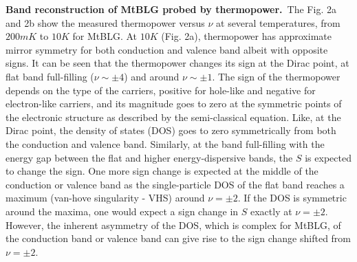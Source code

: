 \documentclass{nature}
\begin{document}
\noindent\textbf{Band reconstruction of MtBLG probed by thermopower.}\ 
The Fig. 2a and 2b show the measured thermopower versus $\nu$ at several temperatures, from $200mK$ to $10 K$ for MtBLG. %
At $10K$ (Fig. 2a), thermopower has approximate mirror symmetry for both conduction and valence band albeit with opposite signs. It can be seen that the thermopower changes its sign at the Dirac point, at flat band full-filling ($\nu \sim \pm 4$) and around $\nu \sim \pm 1$. The sign of the thermopower depends on the type of the carriers, positive for hole-like and negative for electron-like carriers, and its magnitude goes to zero at the symmetric points of the electronic structure as described by the semi-classical equation. Like, at the Dirac point, the density of states (DOS) goes to zero symmetrically from both the conduction and valence band. Similarly, at the band full-filling with the energy gap between the flat and higher energy-dispersive bands, the $S$ is expected to change the sign. One more sign change is expected at the middle of the conduction or valence band as the single-particle DOS of the flat band %
reaches a maximum (van-hove singularity - VHS) around $\nu=\pm 2$. %
If the DOS is symmetric around the maxima, one would expect a sign change in $S$ exactly at $\nu=\pm 2$. However, the inherent asymmetry of the DOS, which is complex for MtBLG, of the conduction band or valence band can give rise to the sign change shifted from $\nu=\pm 2$. %
\end{document}
